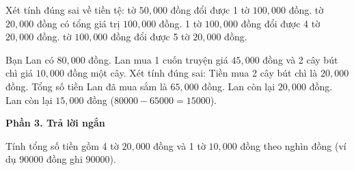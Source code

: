 \begin{ex} %
Xét tính đúng sai về tiền tệ:
\choiceTF
{ tờ $50,000$ đồng đổi được 1 tờ $100,000$ đồng.}
{ tờ $20,000$ đồng có tổng giá trị $100,000$ đồng.}
{1 tờ $100,000$ đồng đổi được 4 tờ $20,000$ đồng.}
{ tờ $100,000$ đồng đổi được 5 tờ $20,000$ đồng.}
\end{ex}

\begin{ex} %
Bạn Lan có $80,000$ đồng. Lan mua 1 cuốn truyện giá $45,000$ đồng và 2 cây bút chì giá $10,000$ đồng một cây. Xét tính đúng sai:
\choiceTF
{\True Tiền mua 2 cây bút chì là $20,000$ đồng.}
{\True Tổng số tiền Lan đã mua sắm là $65,000$ đồng.}
{Lan còn lại $20,000$ đồng.}
{\True Lan còn lại $15,000$ đồng ($80000 - 65000 = 15000$).}
\end{ex}

\textbf{Phần 3. Trả lời ngắn}

\begin{ex} %
Tính tổng số tiền gồm 4 tờ $20,000$ đồng và 1 tờ $10,000$ đồng theo nghìn đồng (ví dụ 90000 đồng ghi 90000).
\end{ex}

